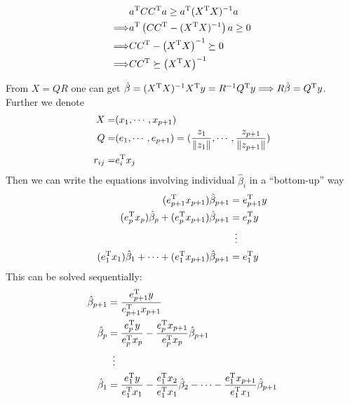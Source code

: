\begin{sol}
\begin{enumerate}
\begin{align*}
& a^{\mathrm{T}}CC^{\mathrm{T}}a\ge a^{\mathrm{T}}(X^{\mathrm{T}}X)^{-1}a\\
\Longrightarrow & a^{\mathrm{T}}\left(CC^{\mathrm{T}}-(X^{\mathrm{T}}X)^{-1}\right)a\ge 0\\
\Longrightarrow & CC^{\mathrm{T}} - \left(X^{\mathrm{T}}X\right)^{-1} \succeq 0\\
\Longrightarrow & CC^{\mathrm{T}}\succeq \left(X^{\mathrm{T}}X\right)^{-1}
\end{align*}
\end{enumerate}
\end{sol}

\begin{sol}
From $X=QR$ one can get $\hat{\beta}=(X^{\mathrm{T}}X)^{-1}X^{\mathrm{T}}y=R^{-1}Q^{\mathrm{T}}y\Longrightarrow R\hat{\beta}=Q^{\mathrm{T}}y$. Further we denote
\begin{align*}
X =& (x_1,\cdots,x_{p+1})\\
Q =& (e_1,\cdots,e_{p+1})=(\frac{z_1}{\|z_1\|},\cdots,\frac{z_{p+1}}{\|z_{p+1}\|})\\
r_{ij} =& e_i^{\mathrm{T}}x_j
\end{align*}
Then we can write the equations involving individual $\hat{\beta}_i$ in a ``bottom-up'' way
\begin{align*}
(\Tr{e_{p+1}}x_{p+1})\hat{\beta}_{p+1} &= \Tr{e_{p+1}}y\\
(\Tr{e_{p}}x_{p})\hat{\beta}_{p} + (\Tr{e_{p}}x_{p+1})\hat{\beta}_{p+1} &= \Tr{e_{p}}y\\
&\vdotswithin{=}\\
(\Tr{e_{1}}x_{1})\hat{\beta}_{1} + \cdots + (\Tr{e_{1}}x_{p+1})\hat{\beta}_{p+1} &= \Tr{e_{1}}y
\end{align*}
This can be solved sequentially:
\begin{align*}
\hat{\beta}_{p+1} &= \frac{\Tr{e_{p+1}}y}{\Tr{e_{p+1}}x_{p+1}}\\
\hat{\beta}_{p} &= \frac{\Tr{e_{p}}y}{\Tr{e_{p}}x_{p}}-\frac{\Tr{e_{p}}x_{p+1}}{\Tr{e_{p}}x_{p}}\hat{\beta}_{p+1}\\
&\vdotswithin{=}\\
\hat{\beta}_{1} &= \frac{\Tr{e_{1}}y}{\Tr{e_{1}}x_{1}}- \frac{\Tr{e_{1}}x_{2}}{\Tr{e_{1}}x_{1}}\hat{\beta}_{2} - \cdots - \frac{\Tr{e_{1}}x_{p+1}}{\Tr{e_{1}}x_{1}}\hat{\beta}_{p+1}
\end{align*}
\end{sol}

